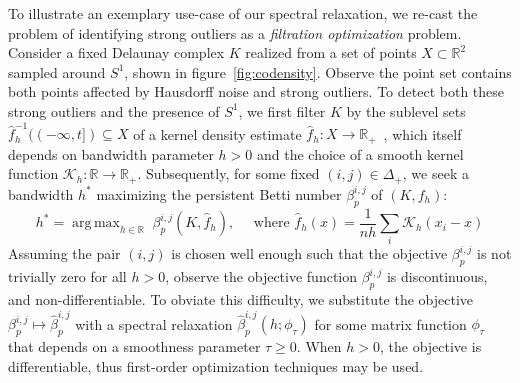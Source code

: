 \documentclass[10pt]{article}
\numberwithin{equation}{section}
\newcommand{\+}{%
	\raisebox{0.18ex}{\scaleobj{0.55}{+}}
}
\DeclareMathOperator*{\argmax}{arg\,max}
\theoremstyle{definition}
\theoremstyle{definition}
\begin{document}
To illustrate an exemplary use-case of our spectral relaxation, we re-cast the problem of identifying strong outliers as a \emph{filtration optimization} problem. Consider a fixed Delaunay complex $K$ realized from a set of points $X \subset \mathbb{R}^2$ sampled around $S^1$, shown in figure~\ref{fig:codensity}. 
Observe the point set contains both points affected by Hausdorff noise and strong outliers. 
To detect both these strong outliers and the presence of $S^1$, we first filter $K$ by the sublevel sets $\hat{f}_h^{-1}((-\infty, t]) \subseteq X$ of a kernel density estimate $\hat{f}_h : X \to \mathbb{R}_+$~\cite{}, which itself depends on bandwidth parameter $h > 0$ and the choice of a smooth kernel function $\mathcal{K}_h : \mathbb{R} \to \mathbb{R}_+$.
%	
Subsequently, for some fixed $(i,j) \in \Delta_+$, we seek a bandwidth $h^\ast$ maximizing the persistent Betti number $\beta_p^{i,j}$ of $(K, f_h)$:
\begin{equation}\label{eq:betti_opt}
	h^\ast = \argmax_{h \in \mathbb{R}} \; \beta_p^{i,j}(K, \hat{f}_h), \quad \text{ where } \hat{f}_h(x) = \frac{1}{nh} \sum_{i} \mathcal{K}_h(x_i - x)
\end{equation}
Assuming the pair $(i,j)$ is chosen well enough such that the objective $\beta_p^{i,j}$ is not trivially zero for all $h > 0$, observe the objective function $\beta_p^{i,j}$ is discontinuous, and non-differentiable. 
To obviate this difficulty, we substitute the objective $\beta_p^{i,j} \mapsto \hat{\beta}_p^{i,j}$ with a spectral relaxation $\hat{\beta}_p^{i,j}(h; \phi_\tau)$ for some matrix function $\phi_\tau$ that depends on a smoothness parameter $\tau \geq 0$. When $h > 0$, the objective is differentiable, thus first-order optimization techniques may be used. 


\end{document}
